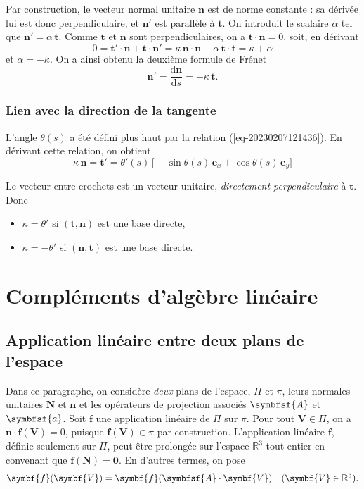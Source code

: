 \documentclass[
  a4paper,
  DIV=11,
  numbers=noendperiod]{scrreprt}
\providecommand{\tightlist}{%
  \setlength{\itemsep}{0pt}\setlength{\parskip}{0pt}}\usepackage{longtable,booktabs,array}
\newcommand{\D}{{\mathrm d}}
\newcommand{\reals}{\mathbb R}
\newcommand{\tens}[1]{\symbfsf{#1}}
\renewcommand{\vec}[1]{\symbf{#1}}
\begin{document}
Par construction, le vecteur normal unitaire \(\vec n\) est de norme
constante : sa dérivée lui est donc perpendiculaire, et \(\vec n'\) est
parallèle à \(\vec t\). On introduit le scalaire \(\alpha\) tel que
\(\vec n' = \alpha \, \vec t\). Comme \(\vec t\) et \(\vec n\) sont
perpendiculaires, on a \(\vec t \cdot \vec n = 0\), soit, en dérivant \[
0 = \vec t' \cdot \vec n + \vec t \cdot \vec n' = \kappa \, \vec n \cdot \vec n + \alpha \, \vec t \cdot \vec t = \kappa + \alpha
\] et \(\alpha = -\kappa\). On a ainsi obtenu la deuxième formule de
Frénet \[
\vec n' = \frac{\D \vec{n}}{\D s} = -\kappa \, \vec t.
\]

\hypertarget{lien-avec-la-direction-de-la-tangente}{%
\subsection{Lien avec la direction de la
tangente}\label{lien-avec-la-direction-de-la-tangente}}

L'angle \(\theta(s)\) a été défini plus haut par la relation
(\ref{eq-20230207121436}). En dérivant cette relation, on obtient \[
\kappa \, \vec n = \vec t' = \theta'(s) \, \bigl[ -\sin \theta(s) \, \vec e_x + \cos \theta(s) \, \vec e_y \bigr]
\]

Le vecteur entre crochets est un vecteur unitaire, \emph{directement
perpendiculaire} à \(\vec t\). Donc

\begin{itemize}
\tightlist
\item
  \(\kappa = \theta'\) si \((\vec t, \vec n)\) est une base directe,
\item
  \(\kappa = -\theta'\) si \((\vec n, \vec t)\) est une base directe.
\end{itemize}

\hypertarget{compluxe9ments-dalguxe8bre-linuxe9aire}{%
\chapter{Compléments d'algèbre
linéaire}\label{compluxe9ments-dalguxe8bre-linuxe9aire}}

\hypertarget{sec-20230213110532}{%
\section{Application linéaire entre deux plans de
l'espace}\label{sec-20230213110532}}

Dans ce paragraphe, on considère \emph{deux} plans de l'espace, \(\Pi\)
et \(\pi\), leurs normales unitaires \(\vec N\) et \(\vec n\) et les
opérateurs de projection associés \(\tens A\) et \(\tens a\). Soit
\(\vec{f}\) une application linéaire de \(\Pi\) sur \(\pi\). Pour tout
\(\vec V \in \Pi\), on a \(\vec n \cdot \vec{f}(\vec V) = 0\), puisque
\(\vec{f}(\vec V) \in \pi\) par construction. L'application linéaire
\(\vec{f}\), définie seulement sur \(\Pi\), peut être prolongée sur
l'espace \(\reals^3\) tout entier en convenant que
\(\vec{f}(\vec N) = \vec{0}\). En d'autres termes, on pose \[
\vec{f}(\vec{V}) = \vec{f}(\tens A \cdot \vec{V}) \quad (\vec V \in \reals^3).
\]
\end{document}
